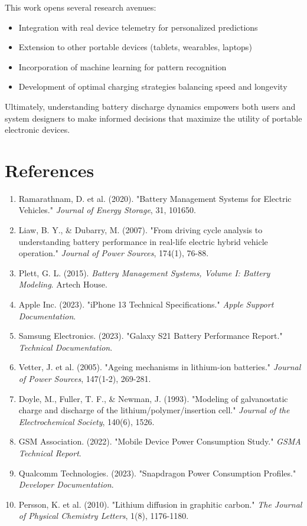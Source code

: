 \documentclass[12pt]{article}
\begin{document}
This work opens several research avenues:
\begin{itemize}
\item Integration with real device telemetry for personalized predictions
\item Extension to other portable devices (tablets, wearables, laptops)
\item Incorporation of machine learning for pattern recognition
\item Development of optimal charging strategies balancing speed and longevity
\end{itemize}

Ultimately, understanding battery discharge dynamics empowers both users and system designers to make informed decisions that maximize the utility of portable electronic devices.

\section*{References}

\begin{enumerate}
\item Ramarathnam, D. et al. (2020). "Battery Management Systems for Electric Vehicles." \textit{Journal of Energy Storage}, 31, 101650.

\item Liaw, B. Y., \& Dubarry, M. (2007). "From driving cycle analysis to understanding battery performance in real-life electric hybrid vehicle operation." \textit{Journal of Power Sources}, 174(1), 76-88.

\item Plett, G. L. (2015). \textit{Battery Management Systems, Volume I: Battery Modeling}. Artech House.

\item Apple Inc. (2023). "iPhone 13 Technical Specifications." \textit{Apple Support Documentation}.

\item Samsung Electronics. (2023). "Galaxy S21 Battery Performance Report." \textit{Technical Documentation}.

\item Vetter, J. et al. (2005). "Ageing mechanisms in lithium-ion batteries." \textit{Journal of Power Sources}, 147(1-2), 269-281.

\item Doyle, M., Fuller, T. F., \& Newman, J. (1993). "Modeling of galvanostatic charge and discharge of the lithium/polymer/insertion cell." \textit{Journal of the Electrochemical Society}, 140(6), 1526.

\item GSM Association. (2022). "Mobile Device Power Consumption Study." \textit{GSMA Technical Report}.

\item Qualcomm Technologies. (2023). "Snapdragon Power Consumption Profiles." \textit{Developer Documentation}.

\item Persson, K. et al. (2010). "Lithium diffusion in graphitic carbon." \textit{The Journal of Physical Chemistry Letters}, 1(8), 1176-1180.
\end{enumerate}
\end{document}
